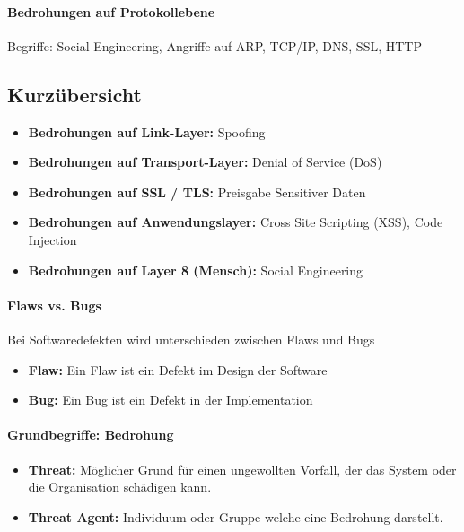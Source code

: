 \documentclass[10pt,a4paper]{article}
\begin{document}
\paragraph*{Bedrohungen auf Protokollebene}Begriffe: Social Engineering, Angriffe auf ARP, TCP/IP, DNS, SSL, HTTP

\subsection*{Kurzübersicht}
\begin{itemize}[noitemsep,topsep=0pt,leftmargin=*]
    \item \textbf{Bedrohungen auf Link-Layer:} Spoofing
    \item \textbf{Bedrohungen auf Transport-Layer:} Denial of Service (DoS)
    \item \textbf{Bedrohungen auf SSL / TLS:} Preisgabe Sensitiver Daten
    \item \textbf{Bedrohungen auf Anwendungslayer:} Cross Site Scripting (XSS), Code Injection
    \item \textbf{Bedrohungen auf Layer 8 (Mensch):} Social Engineering
\end{itemize}

\paragraph*{Flaws vs. Bugs} Bei Softwaredefekten wird unterschieden zwischen Flaws und Bugs
\begin{itemize}[noitemsep,topsep=0pt,leftmargin=*]
    \item \textbf{Flaw:} Ein Flaw ist ein Defekt im Design der Software
    \item \textbf{Bug:} Ein Bug ist ein Defekt in der Implementation
\end{itemize}

\paragraph*{Grundbegriffe: Bedrohung}
\begin{itemize}[noitemsep,topsep=0pt,leftmargin=*]
    \item \textbf{Threat:} Möglicher Grund für einen ungewollten Vorfall, der das System oder die Organisation schädigen kann.
    \item \textbf{Threat Agent:} Individuum oder Gruppe welche eine Bedrohung darstellt.
\end{itemize}
\end{document}
